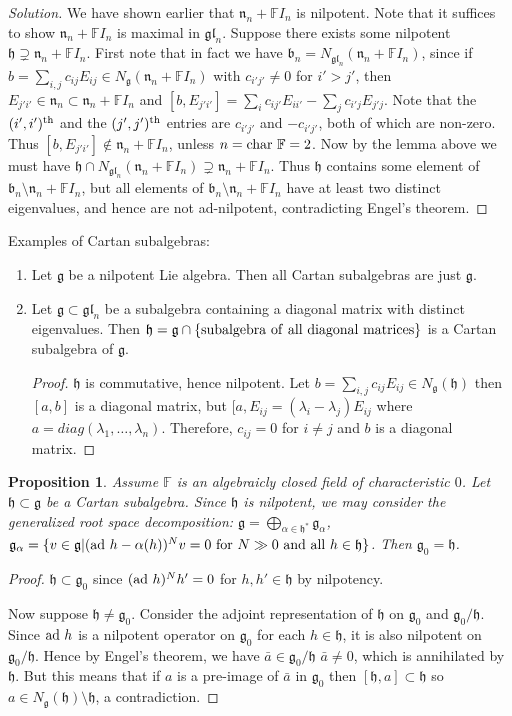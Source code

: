 \documentclass[12pt, fullpage]{article}
\newtheorem{proposition}{Proposition}
\renewcommand{\b}{\mathfrak{b}}
\newcommand{\g}{\mathfrak{g}}
\newcommand{\h}{\mathfrak{h}}
\newcommand{\n}{\mathfrak{n}}
\newcommand{\gl}{\mathfrak{gl}}
\newcommand{\ad}{{\rm ad\ }}
\renewcommand{\char}{{\rm char\ }}
\newcommand{\F}{\mathbb{F}}
\newcommand{\Ngh}{N_\g(\h)}
\newcommand{\nFI}{\n_n+\F I_n}
\newcommand{\go}{\g_0}
\begin{document}
\begin{proof}[Solution]
We have shown earlier that $\n_n+\F I_n$ is nilpotent.  Note that it
suffices to show $\nFI$ is maximal in $\gl_n$.  Suppose there exists
some nilpotent $\h\supsetneq\nFI$.  First note that in fact we have
$\b_n=N_{\gl_n}(\nFI)$, since if $b=\sum_{i,j}c_{ij}E_{ij}\in
N_\g(\nFI)$ with $c_{i'j'}\neq 0$ for $i'>j'$, then
$E_{j'i'}\in\n_n\subset \nFI$ and $[b,E_{j'i'}]= \sum_i
c_{ij'}E_{ii'}-\sum_j c_{i'j}E_{j'j}$.  Note that the $(i',i')^{\rm
th}$ and the $(j',j')^{\rm th}$ entries are $c_{i'j'}$ and
$-c_{i'j'}$, both of which are non-zero.  Thus
$[b,E_{j'i'}]\not\in\nFI$, unless $n=\char \F=2$.  Now by the lemma
above we must have $\h\cap N_{\gl_n}(\nFI)\supsetneq \nFI$.  Thus $\h$
contains some element of $\b_n\setminus \nFI$, but all elements of
$\b_n\setminus \nFI$ have at least two distinct eigenvalues, and hence
are not ad-nilpotent, contradicting Engel's theorem.
\end{proof}

Examples of Cartan subalgebras:

\begin{enumerate}%
\item Let $\g$ be a nilpotent Lie algebra.  Then all Cartan
  subalgebras are just $\g$.
\item Let $\g\subset\gl_n$ be a subalgebra containing a diagonal
  matrix with distinct eigenvalues.  Then $\h=\g\cap\{{\rm subalgebra\
  of\ all\ diagonal\ matrices}\}$ is a Cartan subalgebra of $\g$.

\begin{proof}
$\h$ is commutative, hence nilpotent.  Let
  $b=\sum_{i,j}c_{ij}E_{ij}\in\Ngh$ then $[a,b]$ is a diagonal matrix,
  but $[a,E_{ij}=(\lambda_i-\lambda_j)E_{ij}$ where
  $a=diag(\lambda_1,\ldots,\lambda_n)$.  Therefore, $c_{ij}=0$ for
  $i\neq j$ and $b$ is a diagonal matrix.
\end{proof}
\end{enumerate}

\begin{proposition}
Assume $\F$ is an algebraicly closed field of characteristic $0$.  Let
$\h\subset\g$ be a Cartan subalgebra.  Since $\h$ is nilpotent, we may
consider the generalized root space decomposition:
$\g=\bigoplus_{\alpha\in\h^*} \g_\alpha$, $\g_\alpha=\{v\in\g|(\ad
h-\alpha(h))^Nv=0\ {\rm for}\ N\gg0\ {\rm and\ all}\ h\in\h\}$.  Then
$\g_0=\h$.
\end{proposition}
\begin{proof}
$\h\subset\go$ since $(\ad h)^Nh'=0$ for $h,h'\in\h$ by nilpotency.

Now suppose $\h\neq\go$.  Consider the adjoint representation of $\h$
on $\go$ and $\go/\h$.  Since $\ad h$ is a nilpotent operator on $\go$
for each $h\in\h$, it is also nilpotent on $\go/\h$.  Hence by Engel's
theorem, we have $\bar{a}\in\go/\h$ $\bar{a}\neq 0$, which is
annihilated by $\h$.  But this means that if $a$ is a pre-image of
$\bar{a}$ in $\go$ then $[\h,a]\subset\h$ so $a\in\Ngh\setminus\h$, a
contradiction.
\end{proof}
\end{document}
